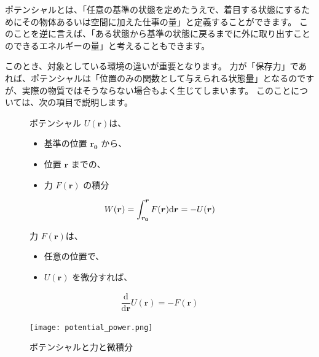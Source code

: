 \documentclass[uplatex,dvipdfmx,a4paper,11pt]{jsarticle}
\begin{document}
ポテンシャルとは、「任意の基準の状態を定めたうえで、着目する状態にするためにその物体あるいは空間に加えた仕事の量」と定義することができます。
このことを逆に言えば、「ある状態から基準の状態に戻るまでに外に取り出すことのできるエネルギーの量」と考えることもできます。

このとき、対象としている環境の違いが重要となります。
力が「保存力」であれば、ポテンシャルは「位置のみの関数として与えられる状態量」となるのですが、実際の物質ではそうならない場合もよく生じてしまいます。
このことについては、次の項目で説明します。
\begin{figure}[htb]
	\begin{center}
		\begin{minipage}{0.4\textwidth}
			\large
			\begin{itembox}[l]{ポテンシャル $U(\bm{r})$は、}
				\begin{itemize}
					\item 基準の位置 $\bm{r_0}$ から、
					\item 位置 $\bm{r}$ までの、
					\item 力 $F(\bm{r})$ の積分
				\end{itemize}
				\vspace{-3mm}
				\begin{align*}
					W(\bm{r}) = \int_{\bm{r_0}}^{\bm{r}} F(\bm{r}) \mathrm{d} \bm{r} = -U(\bm{r})
				\end{align*}
			\end{itembox}
			\begin{itembox}[l]{力 $F(\bm{r})$は、}
				\begin{itemize}
					\item 任意の位置で、
					\item $U(\bm{r})$ を微分すれば、
				\end{itemize}
				\vspace{-3mm}
					\begin{align*}
						\dfrac{\mathrm{d}}{\mathrm{d}\bm{r}} U(\bm{r}) = -F(\bm{r})
					\end{align*}
			\end{itembox}
		\end{minipage}
		\begin{minipage}{0.5\textwidth}
			\begin{center}
			\texttt{[image: potential\_power.png]}
			\end{center}
		\end{minipage}
		\caption{ポテンシャルと力と微積分}
		\label{fig:pot_power}
	\end{center}
\end{figure}
\end{document}
